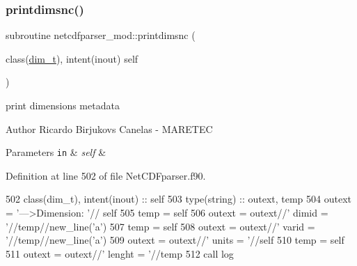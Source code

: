 \subsubsection{\texorpdfstring{printdimsnc()}{printdimsnc()}}
{\footnotesize\ttfamily subroutine netcdfparser\+\_\+mod\+::printdimsnc (\begin{DoxyParamCaption}\item[{class(\mbox{\hyperlink{structnetcdfparser__mod_1_1dim__t}{dim\+\_\+t}}), intent(inout)}]{self }\end{DoxyParamCaption})\hspace{0.3cm}{\ttfamily [private]}}



print dimensions metadata 

\begin{DoxyAuthor}{Author}
Ricardo Birjukovs Canelas -\/ M\+A\+R\+E\+T\+EC 
\end{DoxyAuthor}

\begin{DoxyParams}[1]{Parameters}
\mbox{\tt in}  & {\em self} & \\
\hline
\end{DoxyParams}


Definition at line 502 of file Net\+C\+D\+Fparser.\+f90.


\begin{DoxyCode}
502     \textcolor{keywordtype}{class}(dim\_t), \textcolor{keywordtype}{intent(inout)} :: self
503     \textcolor{keywordtype}{type}(string) :: outext, temp
504     outext = \textcolor{stringliteral}{'--->Dimension: '}// self%
505     temp = self%
506     outext = outext//\textcolor{stringliteral}{'       dimid = '}//temp//new\_line(\textcolor{stringliteral}{'a'})
507     temp = self%
508     outext = outext//\textcolor{stringliteral}{'       varid = '}//temp//new\_line(\textcolor{stringliteral}{'a'})
509     outext = outext//\textcolor{stringliteral}{'       units = '}//self%
510     temp = self%
511     outext = outext//\textcolor{stringliteral}{'       lenght = '}//temp
512     \textcolor{keyword}{call }log%
\end{DoxyCode}
\mbox{\label{namespacenetcdfparser__mod_aeb48d33c014bae21b2fceaaa70cbdc67}} 
